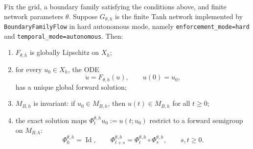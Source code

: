 \begin{theorem}\label{thm:boundary-global-semiflow}
Fix the grid, a boundary family satisfying the conditions above, and finite network parameters $\theta$.  Suppose $G_{\theta,h}$ is the finite Tanh network implemented by \texttt{BoundaryFamilyFlow} in hard autonomous mode, namely \texttt{enforcement\_mode=hard} and \texttt{temporal\_mode=autonomous}.  Then:
\begin{enumerate}[label=(\roman*)]
    \item $F_{\theta,h}$ is globally Lipschitz on $X_h$;
    \item for every $u_0\in X_h$, the ODE
    \begin{equation}\label{eq:boundary-neural-ode}
    \dot u=F_{\theta,h}(u),\qquad u(0)=u_0,
    \end{equation}
    has a unique global forward solution;
    \item $M_{B,h}$ is invariant: if $u_0\in M_{B,h}$, then $u(t)\in M_{B,h}$ for all $t\geq0$;
    \item the exact solution maps $\Phi_t^{\theta,h}u_0:=u(t;u_0)$ restrict to a forward semigroup on $M_{B,h}$:
    \begin{equation}\label{eq:boundary-exact-semigroup}
    \Phi_0^{\theta,h}=\operatorname{Id},\qquad \Phi_{t+s}^{\theta,h}=\Phi_t^{\theta,h}\circ\Phi_s^{\theta,h},\qquad s,t\geq0.
    \end{equation}
\end{enumerate}
\end{theorem}

